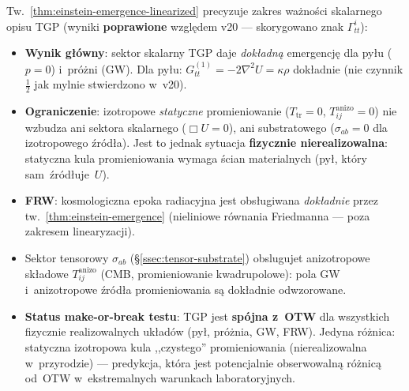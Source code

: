 \begin{remark}\label{rem:emergence-limits}
Tw.~\ref{thm:einstein-emergence-linearized} precyzuje zakres wa\.zno\'sci
skalarne\-go opisu TGP (wyniki \textbf{poprawione} wzgl\k{e}dem v20 ---
skorygowano znak $\Gamma^i_{tt}$):
\begin{itemize}[nosep]
  \item \textbf{Wynik g\l{}\'owny}: sektor skalarny TGP daje
    \emph{dok\l{}adn\k{a}} emergencj\k{e} dla py\l{}u ($p=0$)
    i~pr\'o\.zni (GW).
    Dla py\l{}u: $G^{(1)}_{tt} = -2\nabla^2 U = \kappa\rho$
    dok\l{}adnie (nie czynnik $\frac{1}{2}$ jak mylnie stwierdzono w~v20).
  \item \textbf{Ograniczenie}: izotropowe \emph{statyczne} promieniowanie
    ($T_{\mathrm{tr}} = 0$, $T^{\mathrm{anizo}}_{ij} = 0$) nie wzbudza
    ani sektora skalarnego ($\Box U = 0$), ani substratowego
    ($\sigma_{ab}=0$ dla izotropowego \'zr\'od\l{}a).
    Jest to jednak sytuacja \textbf{fizycznie nierealizowalna}:
    statyczna kula promieniowania wymaga \'scian materialnych (py\l{},
    kt\'ory sam~\'zr\'od\l{}uje~$U$).
  \item \textbf{FRW}: kosmologiczna epoka radiacyjna jest obs\l{}ugiwana
    \emph{dok\l{}adnie} przez tw.~\ref{thm:einstein-emergence}
    (nieliniowe r\'ownania Friedmanna --- poza zakresem linearyzacji).
  \item Sektor tensorowy $\sigma_{ab}$ (\S\ref{ssec:tensor-substrate})
    obslugujet anizotropowe sk\l{}adowe $T^{\mathrm{anizo}}_{ij}$
    (CMB, promieniowanie kwadrupolowe): pola GW i~anizotropowe
    \'zr\'od\l{}a promieniowania s\k{a} dok\l{}adnie odwzorowane.
  \item \textbf{Status make-or-break testu}:
    TGP jest \textbf{sp\'ojna z~OTW} dla wszystkich fizycznie
    realizowalnych uk\l{}ad\'ow (py\l{}, pr\'o\.znia, GW, FRW).
    Jedyna r\'o\.znica: statyczna izotropowa kula ,,czystego''
    promieniowania (nierealizowalna w~przyrodzie) --- predykcja,
    kt\'ora jest potencjalnie obserwowaln\k{a} r\'o\.znic\k{a}
    od~OTW w~ekstremalnych warunkach laboratoryjnych.
\end{itemize}
\end{remark}

